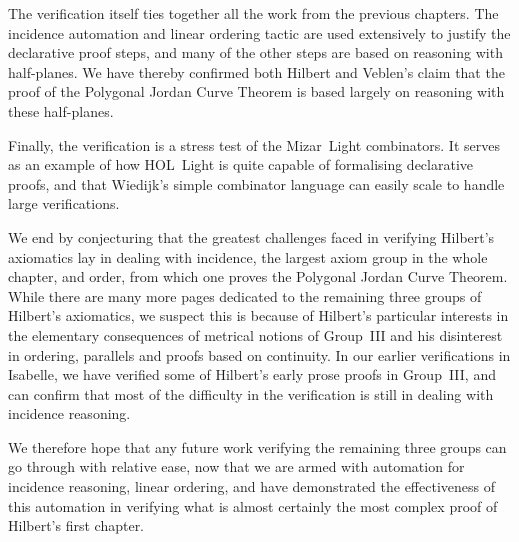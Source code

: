 The verification itself ties together all the work from the previous chapters. The incidence automation and linear ordering tactic are used extensively to justify the declarative proof steps, and many of the other steps are based on reasoning with half-planes. We have thereby confirmed both Hilbert and Veblen's claim that the proof of the Polygonal Jordan Curve Theorem is based largely on reasoning with these half-planes.

Finally, the verification is a stress test of the Mizar~Light combinators. It serves as an example of how HOL~Light is quite capable of formalising declarative proofs, and that Wiedijk's simple combinator language can easily scale to handle large verifications.

We end by conjecturing that the greatest challenges faced in verifying Hilbert's axiomatics lay in dealing with incidence, the largest axiom group in the whole chapter, and order, from which one proves the Polygonal Jordan Curve Theorem. While there are many more pages dedicated to the remaining three groups of Hilbert's axiomatics, we suspect this is because of Hilbert's particular interests in the elementary consequences of metrical notions of Group~III and his disinterest in ordering, parallels and proofs based on continuity. In our earlier verifications in Isabelle, we have verified some of Hilbert's early prose proofs in Group~III, and can confirm that most of the difficulty in the verification is still in dealing with incidence reasoning.

We therefore hope that any future work verifying the remaining three groups can go through with relative ease, now that we are armed with automation for incidence reasoning, linear ordering, and have demonstrated the effectiveness of this automation in verifying what is almost certainly the most complex proof of Hilbert's first chapter.
